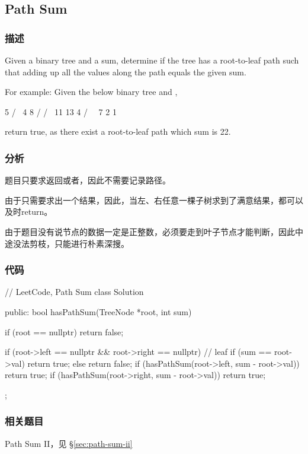 \subsection{Path Sum}
\label{sec:path-sum}


\subsubsection{描述}
Given a binary tree and a sum, determine if the tree has a root-to-leaf path such that adding up all the values along the path equals the given sum.

For example:
Given the below binary tree and ,
\begin{Code}
          5
         / \
        4   8
       /   / \
      11  13  4
     /  \      \
    7    2      1
\end{Code}
return true, as there exist a root-to-leaf path  which sum is 22.


\subsubsection{分析}
题目只要求返回或者，因此不需要记录路径。

由于只需要求出一个结果，因此，当左、右任意一棵子树求到了满意结果，都可以及时return。

由于题目没有说节点的数据一定是正整数，必须要走到叶子节点才能判断，因此中途没法剪枝，只能进行朴素深搜。

\subsubsection{代码}

\begin{Code}
// LeetCode, Path Sum
class Solution {
public:
    bool hasPathSum(TreeNode *root, int sum) {
        if (root == nullptr) return false;

        if (root->left == nullptr && root->right == nullptr) { // leaf
            if (sum == root->val) return true;
            else return false;
        }
        if (hasPathSum(root->left, sum - root->val)) return true;
        if (hasPathSum(root->right, sum - root->val)) return true;
    }
};
\end{Code}


\subsubsection{相关题目}
\begindot
\item Path Sum II，见 \S \ref{sec:path-sum-ii}
\myenddot



